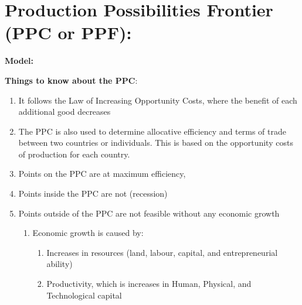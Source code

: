 \documentclass{article}
\begin{document}
\section{Production Possibilities Frontier (PPC or PPF):}

\textbf{Model:}
\begin{center}
\end{center}
\textbf{Things to know about the PPC}:
\begin{enumerate}
    \item It follows the Law of Increasing Opportunity Costs, where the benefit of each additional good decreases
    \item The PPC is also used to determine allocative efficiency and terms of trade between two countries or individuals. This is based on the opportunity costs of production for each country.
    \item Points on the PPC are at maximum efficiency,
    \item Points inside the PPC are not (recession)
    \item  Points outside of the PPC are not feasible without any economic growth
    \begin{enumerate}
        \item Economic growth is caused by:
        \begin{enumerate}
            \item Increases in resources (land, labour, capital, and entrepreneurial ability)
            \item Productivity, which is increases in Human, Physical, and Technological capital
        \end{enumerate}
    \end{enumerate}
\end{enumerate}
\end{document}

